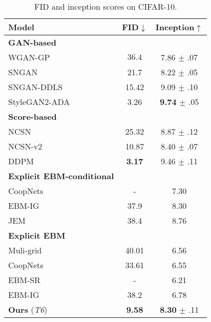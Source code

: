 \documentclass{article} \usepackage{iclr2021_conference,times}
\begin{document}
\begin{center}
\begin{minipage}[c]{.55\textwidth}
\begin{table}[H]
\centering
 \caption{FID and inception scores on CIFAR-10. } 
 \footnotesize
 \setlength\tabcolsep{3.0pt}
 \begin{tabular}{lcc}
    \toprule
    Model & FID$\downarrow$ & Inception$\uparrow$  \\
        \midrule
{\bf GAN-based} & & \\
      \midrule
      WGAN-GP~\citep{gulrajani2017improved} & $36.4$ & 7.86 $\pm$ .07 \\
      SNGAN~\citep{miyato2018spectral} & 21.7 & 8.22 $\pm$ .05 \\
      SNGAN-DDLS~\citep{che2020your} & 15.42 & 9.09 $\pm$ .10 \\
      StyleGAN2-ADA~\citep{karras2020training} & 3.26 & {\bf 9.74} $\pm$ .05 \\
      \midrule
      {\bf Score-based} & &\\
      \midrule
      NCSN~\citep{song2019generative} & 25.32 & 8.87 $\pm$ .12 \\
      NCSN-v2~\citep{song2020improved} & 10.87 & 8.40 $\pm$ .07 \\
      DDPM~\citep{ho2020denoising} & {\bf 3.17} & 9.46 $\pm$ .11\\
    \midrule 
      {\bf Explicit EBM-conditional} & & \\
      \midrule
      CoopNets~\citep{xie2019cooperative} & - & 7.30 \\
      EBM-IG~\citep{du2019implicit} & 37.9 & 8.30 \\
      JEM~\citep{grathwohl2019your} & 38.4 & 8.76 \\
      \midrule
      {\bf Explicit EBM} & & \\
      \midrule
           Muli-grid~\citep{gao2018learning} & 40.01 & 6.56\\
      CoopNets~\citep{xie2016cooperative} & 33.61 & 6.55 \\
      EBM-SR~\citep{nijkamp2019learning} & - & 6.21 \\
      EBM-IG~\citep{du2019implicit} & 38.2 & 6.78 \\
{\bf Ours} ({\em T6}) & {\bf 9.58} & {\bf 8.30} $\pm$ .11 \\ 
        \bottomrule 
    \end{tabular}
    \label{tabl: fid}
\end{table}
\end{minipage}

\end{center}
\end{document}
